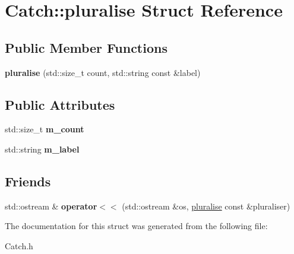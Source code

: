 \hypertarget{struct_catch_1_1pluralise}{\section{Catch\-:\-:pluralise Struct Reference}
\label{struct_catch_1_1pluralise}
}
\subsection*{Public Member Functions}
\begin{DoxyCompactItemize}
\item 
\hypertarget{struct_catch_1_1pluralise_a5c55e22de2416cfe416edf715c6b9234}{{\bfseries pluralise} (std\-::size\-\_\-t count, std\-::string const \&label)}\label{struct_catch_1_1pluralise_a5c55e22de2416cfe416edf715c6b9234}

\end{DoxyCompactItemize}
\subsection*{Public Attributes}
\begin{DoxyCompactItemize}
\item 
\hypertarget{struct_catch_1_1pluralise_a4dce2fa13ec6f00fac09b2418265441e}{std\-::size\-\_\-t {\bfseries m\-\_\-count}}\label{struct_catch_1_1pluralise_a4dce2fa13ec6f00fac09b2418265441e}

\item 
\hypertarget{struct_catch_1_1pluralise_a8849cbdd3f11ebe7747597c8644e8793}{std\-::string {\bfseries m\-\_\-label}}\label{struct_catch_1_1pluralise_a8849cbdd3f11ebe7747597c8644e8793}

\end{DoxyCompactItemize}
\subsection*{Friends}
\begin{DoxyCompactItemize}
\item 
\hypertarget{struct_catch_1_1pluralise_aa7dac6b165514c1f85e0695d678fdef5}{std\-::ostream \& {\bfseries operator$<$$<$} (std\-::ostream \&os, \hyperlink{struct_catch_1_1pluralise}{pluralise} const \&pluraliser)}\label{struct_catch_1_1pluralise_aa7dac6b165514c1f85e0695d678fdef5}

\end{DoxyCompactItemize}


The documentation for this struct was generated from the following file\-:\begin{DoxyCompactItemize}
\item 
Catch.\-h\end{DoxyCompactItemize}
